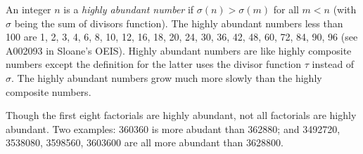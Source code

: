 \documentclass[12pt]{article}
\begin{document}
An integer $n$ is a {\em highly abundant number} if $\sigma(n) > \sigma(m)$ for all $m < n$ (with $\sigma$ being the sum of divisors function). The highly abundant numbers less than 100 are 1, 2, 3, 4, 6, 8, 10, 12, 16, 18, 20, 24, 30, 36, 42, 48, 60, 72, 84, 90, 96 (see A002093 in Sloane's OEIS). Highly abundant numbers are like highly composite numbers except the definition for the latter uses the divisor function $\tau$ instead of $\sigma$. The highly abundant numbers grow much more slowly than the highly composite numbers.

Though the first eight factorials are highly abundant, not all factorials are highly abundant. Two examples: 360360 is more abudant than 362880; and 3492720, 3538080, 3598560, 3603600 are all more abundant than 3628800.
\end{document}
